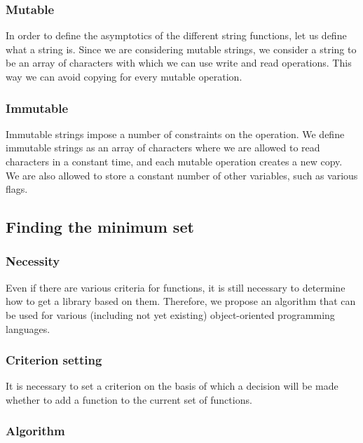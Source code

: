 \documentclass[anonymous,sigplan,review,11pt,nonacm,natbib=false]{acmart}
\begin{document}
    \subsubsection{Mutable}

    In order to define the asymptotics of the different string functions, let us define what a string is. Since we are considering mutable strings, we consider a string to be an array of characters with which we can use write and read operations. This way we can avoid copying for every mutable operation.

    \subsubsection{Immutable}

    Immutable strings impose a number of constraints on the operation. We define immutable strings as an array of characters where we are allowed to read characters in a constant time, and each mutable operation creates a new copy. We are also allowed to store a constant number of other variables, such as various flags.

    \subsection{Finding the minimum set}

    \subsubsection{Necessity}

    Even if there are various criteria for functions, it is still necessary to determine how to get a library based on them. Therefore, we propose an algorithm that can be used for various (including not yet existing) object-oriented programming languages.

    \subsubsection{Criterion setting}

    \label{criterion}

    It is necessary to set a criterion on the basis of which a decision will be made whether to add a function to the current set of functions.

    \subsubsection{Algorithm}
\end{document}
